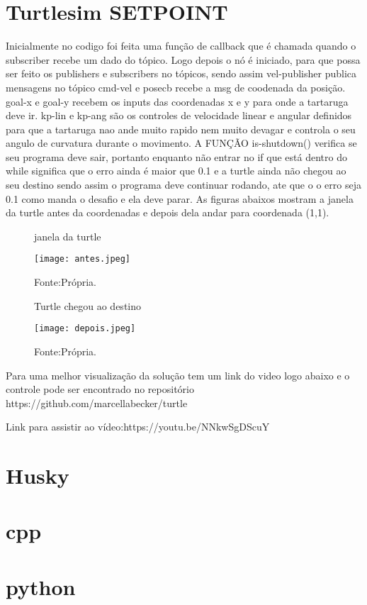\section{Turtlesim SETPOINT}
Inicialmente no codigo foi feita uma função de callback que é chamada quando o subscriber recebe um dado do tópico. 
Logo depois o nó é iniciado, para que possa ser feito os publishers e subscribers no tópicos, sendo assim 
vel-publisher publica mensagens no tópico cmd-vel e posecb recebe a msg de coodenada da posição.
goal-x e goal-y recebem os inputs das coordenadas x e y para onde a tartaruga deve ir. 
kp-lin e kp-ang são os controles de velocidade linear e angular definidos para que a tartaruga nao ande muito rapido nem
muito devagar e controla o seu angulo de curvatura durante o movimento.
A FUNÇÃO is-shutdown() verifica se seu programa deve sair, portanto enquanto não entrar no if que está dentro do while significa que o erro ainda é 
maior que 0.1 e a turtle ainda não chegou ao seu destino sendo assim o programa deve continuar rodando, ate que o o erro seja 0.1 como manda o desafio
e ela deve parar.
As figuras abaixos mostram a janela da turtle antes da coordenadas e depois dela andar para coordenada (1,1).

\begin{figure} [h!]	
    \centering
    \caption{janela da turtle}
    \texttt{[image: antes.jpeg]}
    \caption*{Fonte:Própria.}
    \label{fig:inicio}
\end{figure}

\begin{figure} [h!]	
    \centering
    \caption{Turtle chegou ao destino}
    \texttt{[image: depois.jpeg]}
    \caption*{Fonte:Própria.}
    \label{fig:fim}
\end{figure}
Para uma melhor visualização da solução tem um link do video 
logo abaixo e o controle pode ser encontrado no repositório https://github.com/marcellabecker/turtle  

Link para assistir ao vídeo:https://youtu.be/NNkwSgDScuY
\section{Husky}
\section{cpp}
\section{python}








